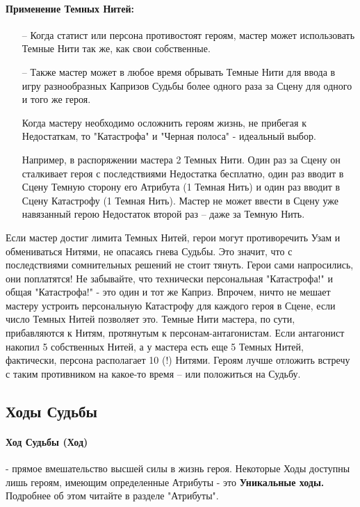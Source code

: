 \paragraph{Применение Темных Нитей:}
\begin{itemize}
    \item[--] Когда статист или персона противостоят героям, мастер может использовать Темные Нити так же, как свои собственные.
    \item[--] Также мастер может в любое время обрывать Темные Нити для ввода в игру разнообразных Капризов Судьбы более одного раза за Сцену для одного и того же героя.
    \begin{tcolorbox}
        Когда мастеру необходимо осложнить героям жизнь, не прибегая к Недостаткам, то "Катастрофа" и "Черная полоса" - идеальный выбор.
    \end{tcolorbox}
    Например, в распоряжении мастера 2 Темных Нити. Один раз за Сцену он сталкивает героя с последствиями Недостатка бесплатно, один раз вводит в Сцену Темную сторону его Атрибута (1 Темная Нить) и один раз вводит в Сцену Катастрофу (1 Темная Нить). Мастер не может ввести в Сцену уже навязанный герою Недостаток второй раз – даже за Темную Нить.
\end{itemize}
Если мастер достиг лимита Темных Нитей, герои могут противоречить Узам и обмениваться Нитями, не опасаясь гнева Судьбы. Это значит, что с последствиями сомнительных решений не стоит тянуть. Герои сами напросились, они поплатятся!
\newline Не забывайте, что технически персональная "Катастрофа!" и общая "Катастрофа!" - это один и тот же Каприз. Впрочем, ничто не мешает мастеру устроить персональную Катастрофу для каждого героя в Сцене, если число Темных Нитей позволяет это.
\newline Темные Нити мастера, по сути, прибавляются к Нитям, протянутым к персонам-антагонистам. Если антагонист накопил 5 собственных Нитей, а у мастера есть еще 5 Темных Нитей, фактически, персона располагает 10 (!) Нитями. Героям лучше отложить встречу с таким противником на какое-то время – или положиться на Судьбу.

\subsection{Ходы Судьбы}
\paragraph{Ход Судьбы (Ход)} - прямое вмешательство высшей силы в жизнь героя. Некоторые Ходы доступны лишь героям, имеющим определенные Атрибуты - это  \textbf{Уникальные ходы.} Подробнее об этом читайте в разделе "Атрибуты".
